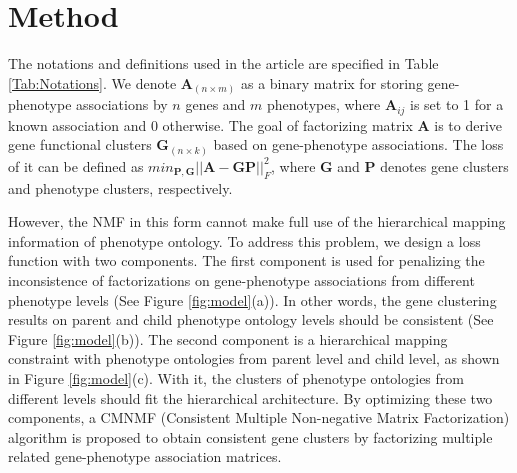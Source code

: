 \documentclass{bmcart}
\begin{document}
\section*{Method}
The notations and definitions used in the article are specified in Table \ref{Tab:Notations}. We denote $\bm{A}_{(n \times m)}$ as a binary matrix for storing gene-phenotype associations by $n$ genes and $m$ phenotypes, where $\bm{A}_{ij}$ is set to 1 for a known association and 0 otherwise. The goal of factorizing matrix $\bm{A}$ is to derive gene functional clusters $\bm{G}_{(n \times k)}$ based on gene-phenotype associations. The loss of it can be defined as $min _{\bm{P},\bm{G}} ||\bm{A}-\bm{GP}||^{2}_{F}$, where $\bm{G}$ and $\bm{P}$ denotes gene clusters and phenotype clusters, respectively.

However, the NMF in this form cannot make full use of the hierarchical mapping information of phenotype ontology. To address this problem, we design a loss function with two components. The first component is used for penalizing the inconsistence of factorizations on gene-phenotype associations from different phenotype levels (See Figure \ref{fig:model}(a)). In other words, the gene clustering results on parent and child phenotype ontology levels should be consistent (See Figure \ref{fig:model}(b)). The second component is a hierarchical mapping constraint with phenotype ontologies from parent level and child level, as shown in Figure \ref{fig:model}(c). With it, the clusters of phenotype ontologies from different levels should fit the hierarchical architecture. By optimizing these two components, a CMNMF (Consistent Multiple Non-negative Matrix Factorization) algorithm is proposed to obtain consistent gene clusters by factorizing multiple related gene-phenotype association matrices.
\end{document}
